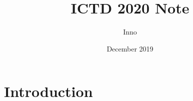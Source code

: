 \documentclass{article}
\title{ICTD 2020 Note}
\author{Inno}
\date{December 2019}
\begin{document}
\maketitle

\section{Introduction}
\end{document}
